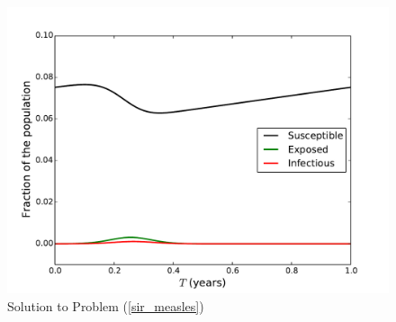 \begin{figure}[ht]
\centering
\includegraphics[width=\textwidth]{measles.pdf}
\caption{Solution to Problem (\ref{sir_measles}) }
\label{sir4}
\end{figure}






